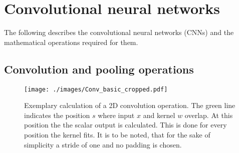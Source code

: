 \section{Convolutional neural networks}\label{convnetworksection}
The following describes the convolutional neural networks (CNNs) and the mathematical operations required for them.
\subsection{Convolution and pooling operations}
\begin{figure}[b]
    \begin{center}
    \texttt{[image: ./images/Conv\_basic\_cropped.pdf]}
    \caption[Convolution.]{{Exemplary calculation of a 2D convolution operation. 
    The green line indicates the position $s$ where input $x$ and kernel $w$ overlap.
    At this position the the scalar output is calculated. This is done for every position the kernel fits.
    It is to be noted, that for the sake of simplicity a stride of one and no padding is chosen.}\label{conv_basic}}
    \end{center} 
\end{figure}

